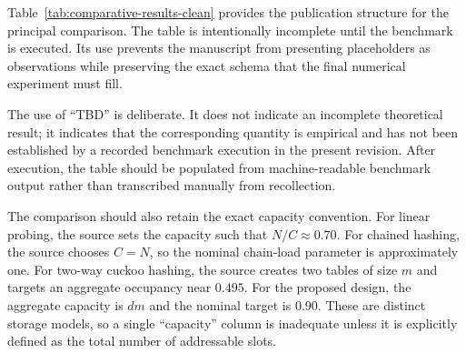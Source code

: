 \documentclass[conference]{IEEEtran}
\begin{document}
Table~\ref{tab:comparative-results-clean} provides the publication structure for the principal comparison. The table is intentionally incomplete until the benchmark is executed. Its use prevents the manuscript from presenting placeholders as observations while preserving the exact schema that the final numerical experiment must fill.

\begin{table}[!t]
\caption{Publication-Ready Comparative Result Schema}
\label{tab:comparative-results-clean}
\centering
{}
\end{table}

The use of ``TBD'' is deliberate. It does not indicate an incomplete theoretical result; it indicates that the corresponding quantity is empirical and has not been established by a recorded benchmark execution in the present revision. After execution, the table should be populated from machine-readable benchmark output rather than transcribed manually from recollection.

The comparison should also retain the exact capacity convention. For linear probing, the source sets the capacity such that $N/C\approx0.70$. For chained hashing, the source chooses $C=N$, so the nominal chain-load parameter is approximately one. For two-way cuckoo hashing, the source creates two tables of size $m$ and targets an aggregate occupancy near $0.495$. For the proposed design, the aggregate capacity is $d m$ and the nominal target is $0.90$. These are distinct storage models, so a single ``capacity'' column is inadequate unless it is explicitly defined as the total number of addressable slots.
\end{document}
